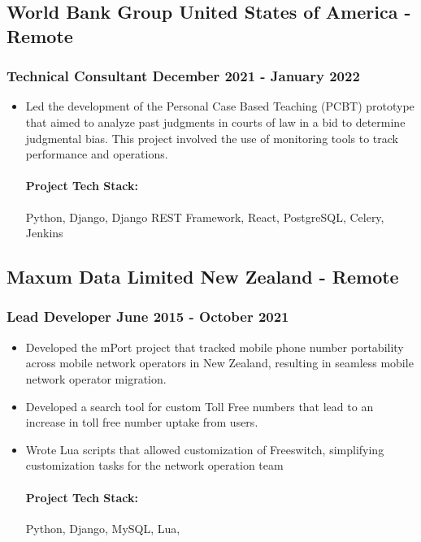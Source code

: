 \documentclass[11pt]{article} %
\begin{document}
\subsection{World Bank Group \hfill United States of America - Remote}
\subsubsection{Technical Consultant \hfill  December 2021 - January 2022}
\begin{itemize}
    \item Led the development of the Personal Case Based Teaching (PCBT) prototype that aimed to analyze past judgments in courts of law in a bid to determine judgmental bias. This project involved the use of monitoring tools to track performance and operations.

    \paragraph{Project Tech Stack:} Python, Django, Django REST Framework, React, PostgreSQL, Celery, Jenkins
\end{itemize}


\subsection{Maxum Data Limited \hfill New Zealand - Remote}
\subsubsection{Lead Developer \hfill  June 2015 - October 2021}
\begin{itemize}
    \item Developed the mPort project that tracked mobile phone number portability across mobile network operators in New Zealand, resulting in seamless mobile network operator migration.
    \item Developed a search tool for custom Toll Free numbers that lead to an increase in toll free number uptake from users.
    \item Wrote Lua scripts that allowed customization of Freeswitch, simplifying customization tasks for the network operation team 

    \paragraph{Project Tech Stack:} Python, Django, MySQL, Lua,
\end{itemize}
\end{document}
